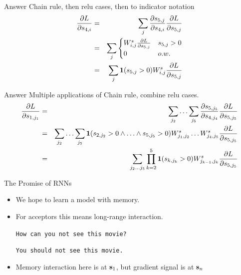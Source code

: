 \documentclass{beamer}
\begin{document}
\begin{frame}{Answer}
  Chain rule, then relu cases, then to indicator notation
  \begin{eqnarray*}
    \frac{\partial L}{\partial s_{4,i} } &=& \sum_{j} \frac{\partial s_{5,j}}{\partial s_{4,i}} \frac{\partial L}{\partial s_{5,j}} \\
     &=&  \sum_{j}
      \begin{cases}
        W^s_{i,j}  \frac{\partial L}{\partial s_{5, j}} &  s_{5, j} > 0\\
        0 &  o.w.\\
      \end{cases} \\
    &=& \sum_{j} \mathbf{1}(s_{5, j} > 0) W^s_{i,j}  \frac{\partial L}{\partial s_{5, j}} 
  \end{eqnarray*}
\end{frame}


\begin{frame}{Answer}
  Multiple applications of Chain rule, combine relu cases.
  \begin{eqnarray*}
    \frac{\partial L}{\partial s_{1,j_1}} &=& \sum_{j_2} \ldots \sum_{j_5} \frac{\partial s_{5,j_5}}{\partial s_{4,j_4}} \frac{\partial L}{\partial s_{5,j_5}}\\
    &=& \sum_{j_2} \ldots \sum_{j_5} \mathbf{1}(s_{2, j_2} > 0\land \ldots  \land s_{5, j_5} > 0) W^s_{j_1,j_2} \ldots W^s_{j_4,j_5}  \frac{\partial L}{\partial s_{5, j_5}}  \\ 
    &=& \sum_{j_2 \ldots j_5} \prod_{k=2}^5 \mathbf{1}(s_{k, j_k} > 0)  W^s_{j_{k-1},j_k}  \frac{\partial L}{\partial s_{5, j_5}}  \\ 
  \end{eqnarray*}
\end{frame}

\begin{frame}{The Promise of RNNs}
  \begin{itemize}
  \item We hope to learn a model with memory.
    \air 
  \item For acceptors this means long-range interaction.

  \air 
  \texttt{How can you not see this movie?}
  \air 

  \texttt{You should not see this movie.}

\item Memory interaction here is at  $\mathbf{s}_1$, but gradient signal is at $\mathbf{s}_n$   
  \end{itemize}
\end{frame}
\end{document}
